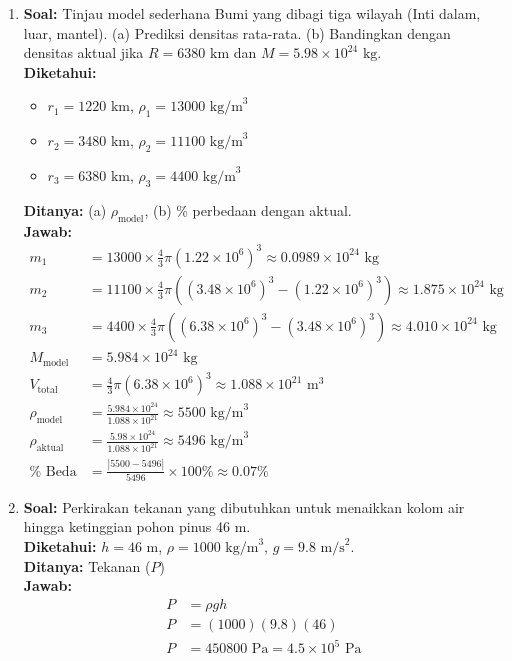\documentclass[twocolumn]{article}
\begin{document}
\begin{enumerate}
    \item \textbf{Soal:} Tinjau model sederhana Bumi yang dibagi tiga wilayah (Inti dalam, luar, mantel). (a) Prediksi densitas rata-rata. (b) Bandingkan dengan densitas aktual jika $R = 6380 \text{ km}$ dan $M = 5.98 \times 10^{24} \text{ kg}$. \\
    \textbf{Diketahui:}
    \begin{itemize}
        \item $r_1=1220 \text{ km}$, $\rho_1=13000 \text{ kg/m}^3$
        \item $r_2=3480 \text{ km}$, $\rho_2=11100 \text{ kg/m}^3$
        \item $r_3=6380 \text{ km}$, $\rho_3=4400 \text{ kg/m}^3$
    \end{itemize}
    \textbf{Ditanya:} (a) $\rho_{\text{model}}$, (b) \% perbedaan dengan aktual. \\
    \textbf{Jawab:}
    \begin{align*}
        m_1 &= 13000 \times \frac{4}{3}\pi (1.22 \times 10^6)^3 \approx 0.0989 \times 10^{24} \text{ kg} \\
        m_2 &= 11100 \times \frac{4}{3}\pi \left((3.48 \times 10^6)^3 - (1.22 \times 10^6)^3\right) \approx 1.875 \times 10^{24} \text{ kg} \\
        m_3 &= 4400 \times \frac{4}{3}\pi \left((6.38 \times 10^6)^3 - (3.48 \times 10^6)^3\right) \approx 4.010 \times 10^{24} \text{ kg} \\
        M_{\text{model}} &= 5.984 \times 10^{24} \text{ kg} \\
        V_{\text{total}} &= \frac{4}{3}\pi (6.38 \times 10^6)^3 \approx 1.088 \times 10^{21} \text{ m}^3 \\
        \rho_{\text{model}} &= \frac{5.984 \times 10^{24}}{1.088 \times 10^{21}} \approx 5500 \text{ kg/m}^3 \\
        \rho_{\text{aktual}} &= \frac{5.98 \times 10^{24}}{1.088 \times 10^{21}} \approx 5496 \text{ kg/m}^3 \\
        \% \text{ Beda} &= \frac{|5500 - 5496|}{5496} \times 100\% \approx 0.07\%
    \end{align*}

    \item \textbf{Soal:} Perkirakan tekanan yang dibutuhkan untuk menaikkan kolom air hingga ketinggian pohon pinus 46 m. \\
    \textbf{Diketahui:} $h = 46 \text{ m}$, $\rho = 1000 \text{ kg/m}^3$, $g = 9.8 \text{ m/s}^2$. \\
    \textbf{Ditanya:} Tekanan ($P$) \\
    \textbf{Jawab:}
    \begin{align*}
        P &= \rho g h \\
        P &= (1000)(9.8)(46) \\
        P &= 450800 \text{ Pa} = 4.5 \times 10^5 \text{ Pa}
    \end{align*}


\end{enumerate}
\end{document}
